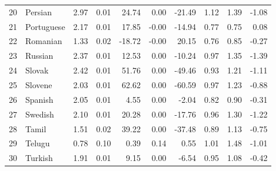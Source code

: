 \documentclass[a4paper]{article}
\begin{document}
\begin{table}[hbtp]
\begin{tabular}{rlrrrrrrrr}
		20 & Persian & 2.97 & 0.01 & 24.74 & 0.00 & -21.49 & 1.12 & 1.39 & -1.08 \\ 
		21 & Portuguese & 2.17 & 0.01 & 17.85 & -0.00 & -14.94 & 0.77 & 0.75 & 0.08 \\ 
		22 & Romanian & 1.33 & 0.02 & -18.72 & -0.00 & 20.15 & 0.76 & 0.85 & -0.27 \\ 
		23 & Russian & 2.37 & 0.01 & 12.53 & 0.00 & -10.24 & 0.97 & 1.35 & -1.39 \\ 
		24 & Slovak & 2.42 & 0.01 & 51.76 & 0.00 & -49.46 & 0.93 & 1.21 & -1.11 \\ 
		25 & Slovene & 2.03 & 0.01 & 62.62 & 0.00 & -60.59 & 0.97 & 1.23 & -0.88 \\ 
		26 & Spanish & 2.05 & 0.01 & 4.55 & 0.00 & -2.04 & 0.82 & 0.90 & -0.31 \\ 
		27 & Swedish & 2.10 & 0.01 & 20.28 & 0.00 & -17.76 & 0.96 & 1.30 & -1.22 \\ 
		28 & Tamil & 1.51 & 0.02 & 39.22 & 0.00 & -37.48 & 0.89 & 1.13 & -0.75 \\ 
		29 & Telugu & 0.78 & 0.10 & 0.39 & 0.14 & 0.55 & 1.01 & 1.48 & -1.01 \\ 
		30 & Turkish & 1.91 & 0.01 & 9.15 & 0.00 & -6.54 & 0.95 & 1.08 & -0.42 \\ 
		\hline
	\end{tabular}
\end{table}
\end{document}
